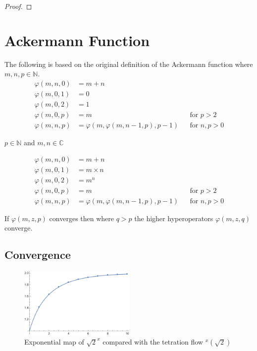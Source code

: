 \documentclass{article}
\theoremstyle{definition}
\begin{document}
\begin{proof}

\end{proof}

\cite{jackson}

\section{Ackermann Function}
The following is based on the original definition of the Ackermann function where $m,n,p\in\mathbb{N}$. \cite{ackermann}
\begin{align}
\varphi(m, n, 0) &= m + n \\ \nonumber
\varphi(m, 0, 1) &= 0 \\ \nonumber
\varphi(m, 0, 2) &= 1 \\ \nonumber
\varphi(m, 0, p) &= m && \text{for } p > 2 \\ \nonumber
\varphi(m, n, p) &= \varphi(m, \varphi(m, n-1, p), p - 1) && \text{for } n, p > 0 \nonumber
\end{align}

$p\in\mathbb{N}$ and $m,n\in\mathbb{C}$

\begin{align}
\varphi(m, n, 0) &= m + n \\ \nonumber
\varphi(m, 0, 1) &= m\times n \\ \nonumber
\varphi(m, 0, 2) &= m^n \\ \nonumber
\varphi(m, 0, p) &= m && \text{for } p > 2 \\ \nonumber
\varphi(m, n, p) &= \varphi(m, \varphi(m, n-1, p), p - 1) && \text{for } n, p > 0 \nonumber
\end{align}


If $\varphi(m, z, p)$ converges then where $q>p$ the higher hyperoperators $\varphi(m, z, q)$ converge.

\subsection{Convergence}


\begin{figure}[htp]
\centering
\includegraphics[width=0.5\textwidth]{Ackermann.png}
\caption{Exponential map of $\sqrt{2}^x$ compared with the tetration flow $^x(\sqrt{2})$}
\label{fig:tetration}
\end{figure}
\end{document}
